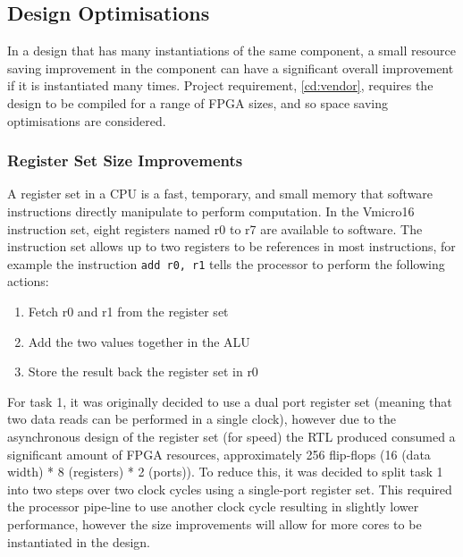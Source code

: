 \subsection{Design Optimisations}
In a design that has many instantiations of the same component, a small resource saving improvement in the component can have a significant overall improvement if it is instantiated many times. Project requirement, \ref{cd:vendor}, requires the design to be compiled for a range of FPGA sizes, and so space saving optimisations are considered. 

\subsubsection{Register Set Size Improvements}
A register set in a CPU is a fast, temporary, and small memory that software instructions directly manipulate to perform computation. In the Vmicro16 instruction set, eight registers named r0 to r7 are available to software. The instruction set allows up to two registers to be references in most instructions, for example the instruction \verb|add r0, r1| tells the processor to perform the following actions:
\begin{enumerate}
\item Fetch r0 and r1 from the register set
\item Add the two values together in the ALU
\item Store the result back the register set in r0
\end{enumerate}
For task 1, it was originally decided to use a dual port register set (meaning that two data reads can be performed in a single clock), however due to the asynchronous design of the register set (for speed) the RTL produced consumed a significant amount of FPGA resources, approximately 256 flip-flops (16 (data width) * 8 (registers) * 2 (ports)). To reduce this, it was decided to split task 1 into two steps over two clock cycles using a single-port register set. This required the processor pipe-line to use another clock cycle resulting in slightly lower performance, however the size improvements will allow for more cores to be instantiated in the design.









